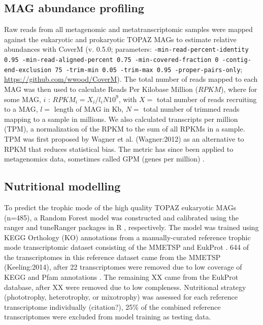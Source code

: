 \documentclass[12pt]{article}
\numberwithin{equation}{section}
\begin{document}
\subsection*{MAG abundance profiling} 

Raw reads from all metagenomic and metatranscriptomic samples were mapped against the eukaryotic and prokaryotic TOPAZ MAGs to estimate relative abundances with CoverM (v. 0.5.0; parameters: \texttt{-min-read-percent-identity 0.95 -min-read-aligned-percent 0.75  -min-covered-fraction 0 -contig-end-exclusion 75 -trim-min 0.05 -trim-max 0.95  -proper-pairs-only}; \url{https://github.com/wwood/CoverM}). The total number of reads mapped to each MAG was then used to calculate Reads Per Kilobase Million ($RPKM$), where for some MAG, $i$ :  $RPKM_i = {X_i}/{l_iN}10^9$, with $X =$ total number of reads recruiting to a MAG, $l =$ length of MAG in Kb, $N =$ total number of trimmed reads mapping to a sample in millions. We also calculated transcripts per million (TPM), a normalization of the RPKM to the sum of all RPKMs in a sample. TPM was first proposed by Wagner et al. (Wagner:2012) \citep{Wagner_2012} as an alternative to RPKM that reduces statistical bias. The metric has since been applied to metagenomics data, sometimes called GPM (genes per million) \citep{Gradoville_2017}. 

\subsection*{Nutritional modelling} 

To predict the trophic mode of the high quality TOPAZ eukaryotic MAGs (n=485), a Random Forest model \citep{Breiman_2001} was constructed and calibrated using the ranger \citep{Wright_2017} and tuneRanger packages in R \citep{tuneRanger}, respectively. The model was trained using KEGG Orthology (KO) annotations \citep{Kanehisa_2019} from a manually-curated reference trophic mode transcriptomic dataset consisting of the MMETSP \citep{Keeling2014} and EukProt \citep{Richter2020EukProt}. 644 of the transcriptomes in this reference dataset came from the MMETSP (Keeling:2014), after 22 transcriptomes were removed due to low coverage of KEGG and Pfam annotations \citep{Finn2014Pfam}. The remaining XX came from the EukProt database, after XX were removed due to low compleness. Nutritional strategy (phototrophy, heterotrophy, or mixotrophy) was assessed for each reference transcriptome individually (citation?), 25\% of the combined reference transcriptomes were excluded from model training as testing data. 
\end{document}
